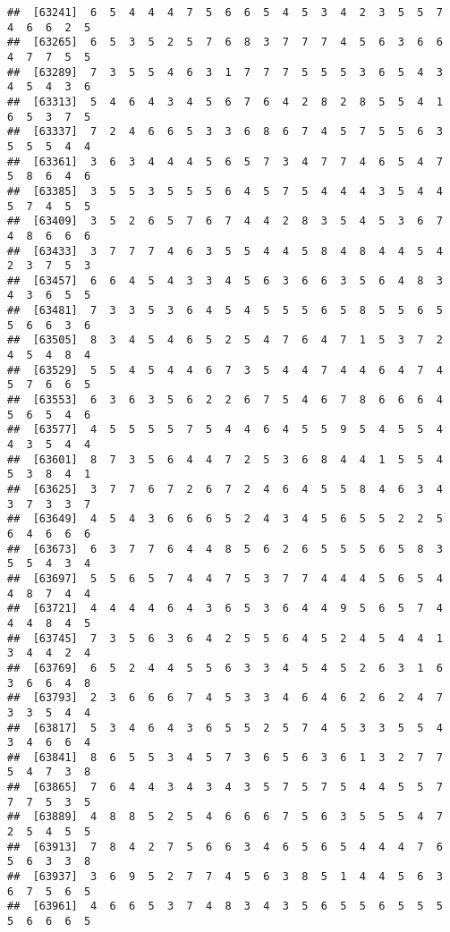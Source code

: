 \documentclass[
]{book}
\begin{document}
\begin{verbatim}
##  [63241]  6  5  4  4  4  7  5  6  6  5  4  5  3  4  2  3  5  5  7  4  6  6  2  5
##  [63265]  6  5  3  5  2  5  7  6  8  3  7  7  7  4  5  6  3  6  6  4  7  7  5  5
##  [63289]  7  3  5  5  4  6  3  1  7  7  7  5  5  5  3  6  5  4  3  4  5  4  3  6
##  [63313]  5  4  6  4  3  4  5  6  7  6  4  2  8  2  8  5  5  4  1  6  5  3  7  5
##  [63337]  7  2  4  6  6  5  3  3  6  8  6  7  4  5  7  5  5  6  3  5  5  5  4  4
##  [63361]  3  6  3  4  4  4  5  6  5  7  3  4  7  7  4  6  5  4  7  5  8  6  4  6
##  [63385]  3  5  5  3  5  5  5  6  4  5  7  5  4  4  4  3  5  4  4  5  7  4  5  5
##  [63409]  3  5  2  6  5  7  6  7  4  4  2  8  3  5  4  5  3  6  7  4  8  6  6  6
##  [63433]  3  7  7  7  4  6  3  5  5  4  4  5  8  4  8  4  4  5  4  2  3  7  5  3
##  [63457]  6  6  4  5  4  3  3  4  5  6  3  6  6  3  5  6  4  8  3  4  3  6  5  5
##  [63481]  7  3  3  5  3  6  4  5  4  5  5  5  6  5  8  5  5  6  5  5  6  6  3  6
##  [63505]  8  3  4  5  4  6  5  2  5  4  7  6  4  7  1  5  3  7  2  4  5  4  8  4
##  [63529]  5  5  4  5  4  4  6  7  3  5  4  4  7  4  4  6  4  7  4  5  7  6  6  5
##  [63553]  6  3  6  3  5  6  2  2  6  7  5  4  6  7  8  6  6  6  4  5  6  5  4  6
##  [63577]  4  5  5  5  5  7  5  4  4  6  4  5  5  9  5  4  5  5  4  4  3  5  4  4
##  [63601]  8  7  3  5  6  4  4  7  2  5  3  6  8  4  4  1  5  5  4  5  3  8  4  1
##  [63625]  3  7  7  6  7  2  6  7  2  4  6  4  5  5  8  4  6  3  4  3  7  3  3  7
##  [63649]  4  5  4  3  6  6  6  5  2  4  3  4  5  6  5  5  2  2  5  6  4  6  6  6
##  [63673]  6  3  7  7  6  4  4  8  5  6  2  6  5  5  5  6  5  8  3  5  5  4  3  4
##  [63697]  5  5  6  5  7  4  4  7  5  3  7  7  4  4  4  5  6  5  4  4  8  7  4  4
##  [63721]  4  4  4  4  6  4  3  6  5  3  6  4  4  9  5  6  5  7  4  4  4  8  4  5
##  [63745]  7  3  5  6  3  6  4  2  5  5  6  4  5  2  4  5  4  4  1  3  4  4  2  4
##  [63769]  6  5  2  4  4  5  5  6  3  3  4  5  4  5  2  6  3  1  6  3  6  6  4  8
##  [63793]  2  3  6  6  6  7  4  5  3  3  4  6  4  6  2  6  2  4  7  3  3  5  4  4
##  [63817]  5  3  4  6  4  3  6  5  5  2  5  7  4  5  3  3  5  5  4  3  4  6  6  4
##  [63841]  8  6  5  5  3  4  5  7  3  6  5  6  3  6  1  3  2  7  7  5  4  7  3  8
##  [63865]  7  6  4  4  3  4  3  4  3  5  7  5  7  5  4  4  5  5  7  7  7  5  3  5
##  [63889]  4  8  8  5  2  5  4  6  6  6  7  5  6  3  5  5  5  4  7  2  5  4  5  5
##  [63913]  7  8  4  2  7  5  6  6  3  4  6  5  6  5  4  4  4  7  6  5  6  3  3  8
##  [63937]  3  6  9  5  2  7  7  4  5  6  3  8  5  1  4  4  5  6  3  6  7  5  6  5
##  [63961]  4  6  6  5  3  7  4  8  3  4  3  5  6  5  5  6  5  5  5  5  6  6  6  5

\end{verbatim}
\end{document}
